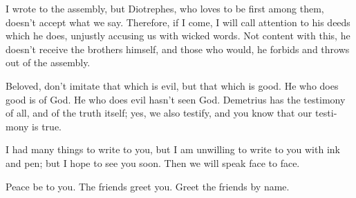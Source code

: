 \begin{paracol}{2}
\begin{otherlanguage}{english}
 I wrote to the assembly, but Diotrephes, who loves to be
first among them, doesn't accept what we say.  Therefore,
if I come, I will call attention to his deeds which he does, unjustly
accusing us with wicked words. Not content with this, he doesn't receive
the brothers himself, and those who would, he forbids and throws out of
the assembly.

 Beloved, don't imitate that which is evil, but that
which is good. He who does good is of God. He who does evil hasn't seen
God.  Demetrius has the testimony of all, and of the
truth itself; yes, we also testify, and you know that our testimony is
true.

 I had many things to write to you, but I am unwilling to
write to you with ink and pen;  but I hope to see you
soon. Then we will speak face to face.

Peace be to you. The friends greet you. Greet the friends by name.
\end{otherlanguage} \end{paracol}
